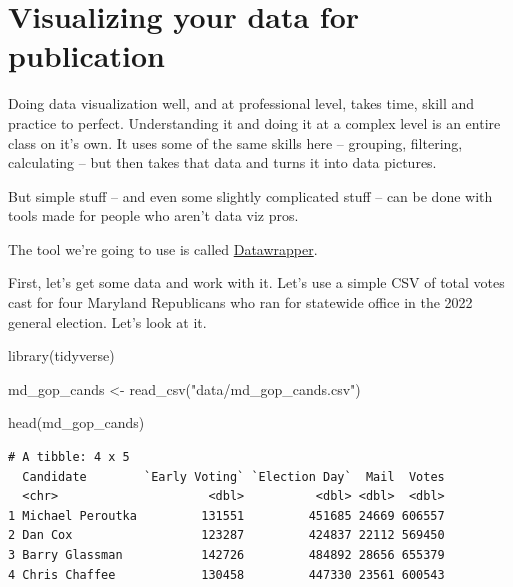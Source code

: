 \documentclass[
  letterpaper,
  DIV=11,
  numbers=noendperiod]{scrreprt}
\newenvironment{Shaded}{\begin{snugshade}}{\end{snugshade}}
\newcommand{\FunctionTok}[1]{\textcolor[rgb]{0.28,0.35,0.67}{#1}}
\newcommand{\NormalTok}[1]{\textcolor[rgb]{0.00,0.23,0.31}{#1}}
\newcommand{\OtherTok}[1]{\textcolor[rgb]{0.00,0.23,0.31}{#1}}
\newcommand{\StringTok}[1]{\textcolor[rgb]{0.13,0.47,0.30}{#1}}
\begin{document}
\hypertarget{visualizing-your-data-for-publication}{%
\chapter{Visualizing your data for
publication}\label{visualizing-your-data-for-publication}}

Doing data visualization well, and at professional level, takes time,
skill and practice to perfect. Understanding it and doing it at a
complex level is an entire class on it's own. It uses some of the same
skills here -- grouping, filtering, calculating -- but then takes that
data and turns it into data pictures.

But simple stuff -- and even some slightly complicated stuff -- can be
done with tools made for people who aren't data viz pros.

The tool we're going to use is called
\href{https://www.datawrapper.de/}{Datawrapper}.

First, let's get some data and work with it. Let's use a simple CSV of
total votes cast for four Maryland Republicans who ran for statewide
office in the 2022 general election. Let's look at it.

\begin{Shaded}
\begin{Highlighting}[]
\FunctionTok{library}\NormalTok{(tidyverse)}
\end{Highlighting}
\end{Shaded}

\begin{Shaded}
\begin{Highlighting}[]
\NormalTok{md\_gop\_cands }\OtherTok{\textless{}{-}} \FunctionTok{read\_csv}\NormalTok{(}\StringTok{"data/md\_gop\_cands.csv"}\NormalTok{)}
\end{Highlighting}
\end{Shaded}

\begin{Shaded}
\begin{Highlighting}[]
\FunctionTok{head}\NormalTok{(md\_gop\_cands)}
\end{Highlighting}
\end{Shaded}

\begin{verbatim}
# A tibble: 4 x 5
  Candidate        `Early Voting` `Election Day`  Mail  Votes
  <chr>                     <dbl>          <dbl> <dbl>  <dbl>
1 Michael Peroutka         131551         451685 24669 606557
2 Dan Cox                  123287         424837 22112 569450
3 Barry Glassman           142726         484892 28656 655379
4 Chris Chaffee            130458         447330 23561 600543
\end{verbatim}
\end{document}
